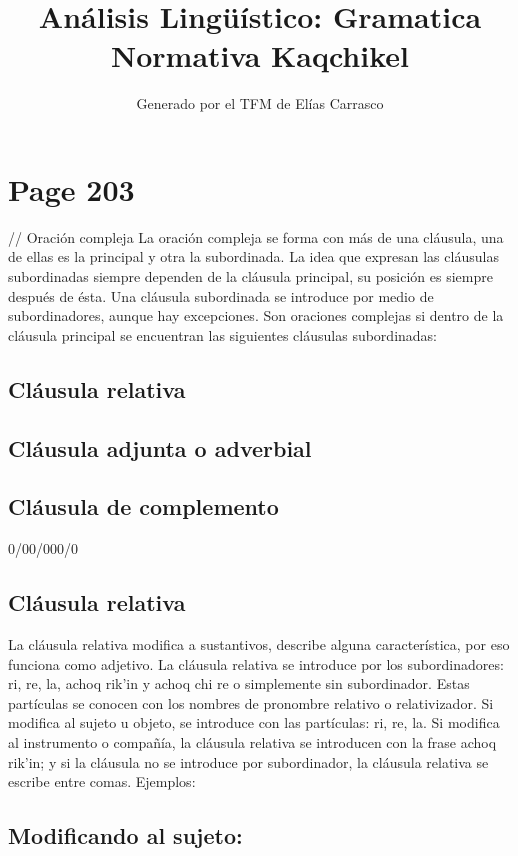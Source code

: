 \documentclass{article}%
\title{Análisis Lingüístico: Gramatica Normativa Kaqchikel}%
\author{Generado por el TFM de Elías Carrasco}%
\begin{document}
%
\normalsize%
\maketitle%
\section{Page 203}%
\label{sec:Page203}%
// Oración compleja %
La oración compleja se forma con más de una cláusula, una de ellas es la principal y %
otra la subordinada. La idea que expresan las cláusulas subordinadas siempre dependen %
de la cláusula principal, su posición es siempre después de ésta. Una cláusula subordinada %
se introduce por medio de subordinadores, aunque hay excepciones. Son oraciones %
complejas si dentro de la cláusula principal se encuentran las siguientes cláusulas %
subordinadas: %
\subsection{Cláusula relativa}%
\label{subsec:Clusularelativa}%

%
\subsection{Cláusula adjunta o adverbial}%
\label{subsec:Clusulaadjuntaoadverbial}%

%
\subsection{Cláusula de complemento}%
\label{subsec:Clusuladecomplemento}%

%
0/00/000/0 %
\subsection{Cláusula relativa}%
\label{subsec:Clusularelativa}%

%
La cláusula relativa modifica a sustantivos, describe alguna característica, por eso %
funciona como adjetivo. La cláusula relativa se introduce por los subordinadores: ri, %
re, la, achoq rik'in y achoq chi re o simplemente sin subordinador. Estas partículas se %
conocen con los nombres de pronombre relativo o relativizador. Si modifica al sujeto u %
objeto, se introduce con las partículas: ri, re, la. Si modifica al instrumento o compañía, %
la cláusula relativa se introducen con la frase achoq rik'in; y si la cláusula no se %
introduce por subordinador, la cláusula relativa se escribe entre comas. Ejemplos: %
\subsection{Modificando al sujeto:}%
\label{subsec:Modificandoalsujeto}%
\end{document}

